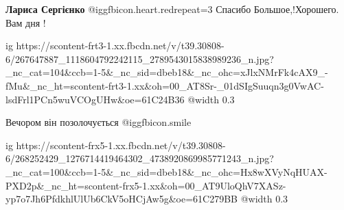 \textbf{Лариса Сергієнко} @igg{fbicon.heart.red}{repeat=3} Спасибо Большое,!Хорошего. Вам дня !


\ifcmt
  ig https://scontent-frt3-1.xx.fbcdn.net/v/t39.30808-6/267647887_1118604792242115_2789543015838989236_n.jpg?_nc_cat=104&ccb=1-5&_nc_sid=dbeb18&_nc_ohc=xJlxNMrFk4cAX9_-fMu&_nc_ht=scontent-frt3-1.xx&oh=00_AT8Sr-_01dSIgSuuqn3g0VwAC-lsdFrl1PCn5wuVCOgUHw&oe=61C24B36
  @width 0.3
\fi

Вечором він позолочується @igg{fbicon.smile} 


\ifcmt
  ig https://scontent-frx5-1.xx.fbcdn.net/v/t39.30808-6/268252429_1276714419464302_4738920869985771243_n.jpg?_nc_cat=100&ccb=1-5&_nc_sid=dbeb18&_nc_ohc=Hx8wXVyNqHUAX-PXD2p&_nc_ht=scontent-frx5-1.xx&oh=00_AT9UloQhV7XASz-yp7o7Jh6PfdkhlUlUb6CkV5oHCjAw5g&oe=61C279BB
  @width 0.3
\fi
